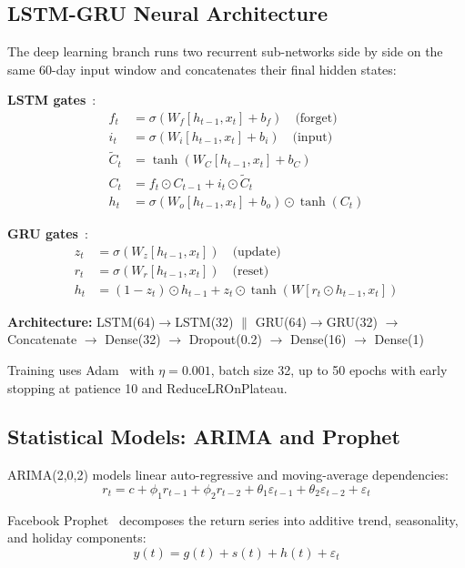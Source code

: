 \documentclass[10pt,a4paper,twoside]{article}
\begin{document}
\subsection{LSTM-GRU Neural Architecture}

The deep learning branch runs two recurrent sub-networks side by side on the
same 60-day input window and concatenates their final hidden states:

\textbf{LSTM gates}~\cite{hochreiter1997}:
\begin{align}
  f_t &= \sigma(W_f [h_{t-1}, x_t] + b_f) \quad\text{(forget)} \\
  i_t &= \sigma(W_i [h_{t-1}, x_t] + b_i) \quad\text{(input)} \\
  \tilde{C}_t &= \tanh(W_C [h_{t-1}, x_t] + b_C) \\
  C_t &= f_t \odot C_{t-1} + i_t \odot \tilde{C}_t \\
  h_t &= \sigma(W_o [h_{t-1}, x_t] + b_o) \odot \tanh(C_t)
\end{align}

\textbf{GRU gates}~\cite{cho2014}:
\begin{align}
  z_t &= \sigma(W_z [h_{t-1}, x_t]) \quad\text{(update)} \\
  r_t &= \sigma(W_r [h_{t-1}, x_t]) \quad\text{(reset)} \\
  h_t &= (1-z_t) \odot h_{t-1} + z_t \odot \tanh(W[r_t \odot h_{t-1}, x_t])
\end{align}

\textbf{Architecture:}
LSTM(64)$\to$LSTM(32) $\|$ GRU(64)$\to$GRU(32) $\to$ Concatenate $\to$ Dense(32) $\to$ Dropout(0.2) $\to$ Dense(16) $\to$ Dense(1)

Training uses Adam~\cite{kingma2015} with $\eta = 0.001$, batch size 32, up to 50 epochs with
early stopping at patience 10 and ReduceLROnPlateau.

\subsection{Statistical Models: ARIMA and Prophet}

ARIMA(2,0,2) models linear auto-regressive and moving-average dependencies:
\begin{equation}
  r_t = c + \phi_1 r_{t-1} + \phi_2 r_{t-2}
          + \theta_1 \varepsilon_{t-1} + \theta_2 \varepsilon_{t-2} + \varepsilon_t
\end{equation}

Facebook Prophet~\cite{taylor2018} decomposes the return series into additive
trend, seasonality, and holiday components:
\begin{equation}
  y(t) = g(t) + s(t) + h(t) + \varepsilon_t
\end{equation}
\end{document}
